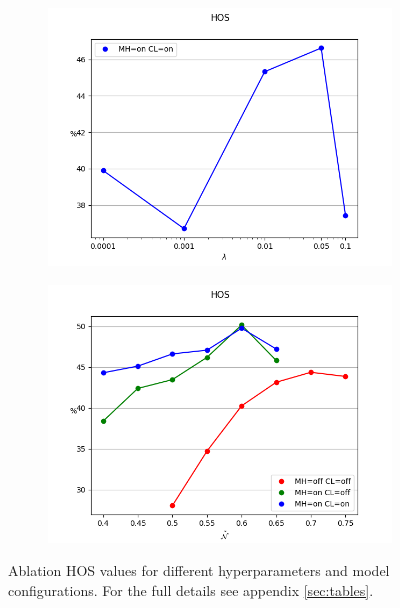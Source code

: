 \documentclass[10pt,twocolumn,letterpaper]{article}
\begin{document}
\begin{figure}[!htb]
\begin{subfigure}[!htb]{0.35\textwidth}
    \includegraphics[trim=0 0 0 2cm, clip, width=\linewidth]{hos-l.png}
  \end{subfigure}
  \begin{subfigure}[!htb]{0.35\textwidth}
    \includegraphics[trim=0 0 0 2cm, clip, width=\linewidth]{hos-th.png}
  \end{subfigure}
  \caption{\centering\label{fig:hyperparams} Ablation HOS values for different hyperparameters and model configurations. For the full details see appendix \ref{sec:tables}.}
\end{figure}
\end{document}
